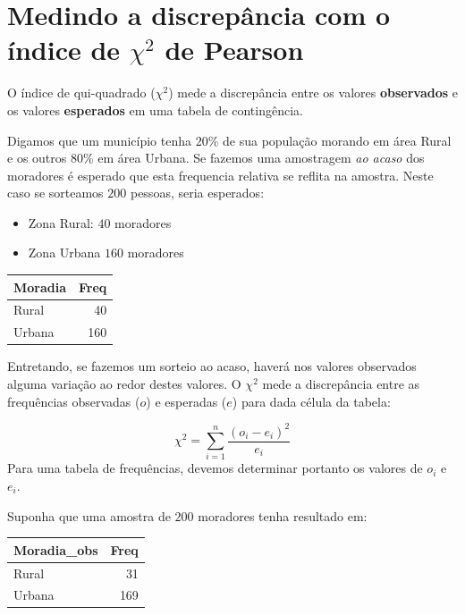 \documentclass[
]{book}
\begin{document}
\hypertarget{medindo-a-discrepuxe2ncia-com-o-uxedndice-de-chi2-de-pearson}{%
\section{\texorpdfstring{Medindo a discrepância com o índice de \(\chi^2\) de Pearson}{Medindo a discrepância com o índice de \textbackslash chi\^{}2 de Pearson}}\label{medindo-a-discrepuxe2ncia-com-o-uxedndice-de-chi2-de-pearson}}

O índice de qui-quadrado (\(\chi^2\)) mede a discrepância entre os valores \textbf{observados} e os valores \textbf{esperados} em uma tabela de contingência.

Digamos que um município tenha \(20\%\) de sua população morando em área Rural e os outros \(80\%\) em área Urbana. Se fazemos uma amostragem \emph{ao acaso} dos moradores é esperado que esta frequencia relativa se reflita na amostra. Neste caso se sorteamos \(200\) pessoas, seria esperados:

\begin{itemize}
\item
  Zona Rural: \(40\) moradores
\item
  Zona Urbana \(160\) moradores
\end{itemize}

\begin{tabular}{l|r}
\hline
Moradia & Freq\\
\hline
Rural & 40\\
\hline
Urbana & 160\\
\hline
\end{tabular}

Entretando, se fazemos um sorteio ao acaso, haverá nos valores observados alguma variação ao redor destes valores. O \(\chi^2\) mede a discrepância entre as frequências observadas (\(o\)) e esperadas (\(e\)) para dada célula da tabela:

\[\chi^2 = \sum_{i=1}^{n}\frac{(o_i - e_i)^2}{e_i}\]
Para uma tabela de frequências, devemos determinar portanto os valores de \(o_i\) e \(e_i\).

Suponha que uma amostra de \(200\) moradores tenha resultado em:

\begin{tabular}{l|r}
\hline
Moradia\_obs & Freq\\
\hline
Rural & 31\\
\hline
Urbana & 169\\
\hline
\end{tabular}
\end{document}

